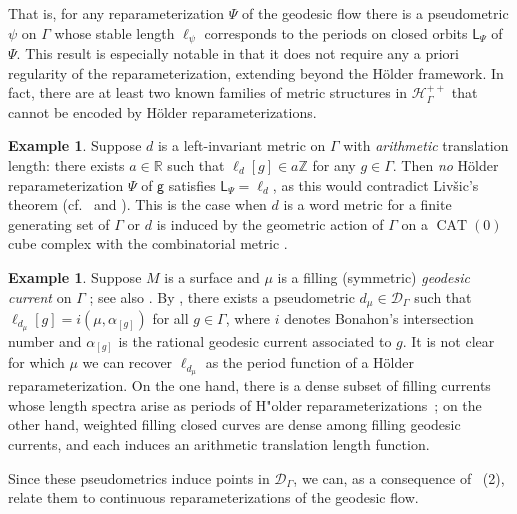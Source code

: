 \documentclass[twoside]{amsart}
\theoremstyle{definition}
\newtheorem{example}[theorem]{Example}
\numberwithin{equation}{section}
\numberwithin{theorem}{section}
\newcommand{\msf}[1]{\mathsf{#1}}
\newcommand{\R}{\mathbb{R}}
\newcommand{\Z}{\mathbb{Z}}
\newcommand{\calD}{\mathcal{D}}
\newcommand{\scrD}{\mathscr{D}}
\newcommand{\scrH}{\mathscr{H}}
\newcommand{\al}{\alpha}
\newcommand{\G}{\Gamma}
\newcommand{\p}{\psi}
\DeclareMathOperator{\CAT}{CAT}
\newcommand{\sfP}{\mathsf{\Psi}}
\begin{document}
That is, for any reparameterization $\sfP$ of the geodesic flow there is a pseudometric $\p$ on $\G$ whose stable length $\ell_\p$ corresponds to the periods on closed orbits $\msf{L}_\sfP$ of $\sfP$. %
This result is especially notable in that it does not require any a priori regularity of the reparameterization, extending beyond the H\"older framework. In fact, there are at least two known families of metric structures in $\scrH_\G^{++}$ that cannot be encoded by H\"older reparameterizations.

\begin{example}\label{ex:nonarithmetic}
    Suppose $d$ is a left-invariant metric on $\G$ with \emph{arithmetic} translation length: there exists $a\in \R$ such that $\ell_d[g]\in a\Z$ for any $g\in \G$. Then \emph{no} H\"older reparameterization  $\sfP$ of $\msf{g}$ satisfies $\msf{L}_{\sfP}=\ell_d$, as this would contradict Liv\v{s}ic's theorem \cite{livsic} (cf.~\cite[Theorem~1.3]{GMM} and \cite[Theorem~1.4]{cantrell.mixing}). This is the case when $d$ is a word metric for a finite generating set of $\G$ \cite{cannon} or $d$ is induced by the geometric action of $\G$ on a $\CAT(0)$ cube complex with the combinatorial metric \cite{haglund}.
\end{example}

\begin{example}Suppose $M$ is a surface and  $\mu$ is a filling (symmetric) \emph{geodesic current} on $\G$ \cite{bonahon.annals}; see also . By \cite{BIPP, cantrell-reyes.manhattan, derosa-martinezgranado},  there exists a pseudometric $d_\mu\in \calD_\G$ such that $\ell_{d_\mu}[g]=i(\mu,\al_{[g]})$ for all $g\in \G$, where $i$ denotes Bonahon's intersection number and $\al_{[g]}$ is the rational geodesic current associated to $g$. It is not clear for which $\mu$ we can recover $\ell_{d_\mu}$ as the period function of a H\"older reparameterization. On the one hand, there is a dense subset of filling currents whose length spectra arise as periods of H"older reparameterizations~\cite{JyothisMartinezGranado:NegCurvCurrents}; on the other hand, weighted filling closed curves are dense among filling geodesic currents, and each induces an arithmetic translation length function.
\end{example}

Since these pseudometrics induce points in $\scrD_\G$, we can,  as a consequence of ~(2), relate them to continuous reparameterizations of the geodesic flow.
\end{document}
